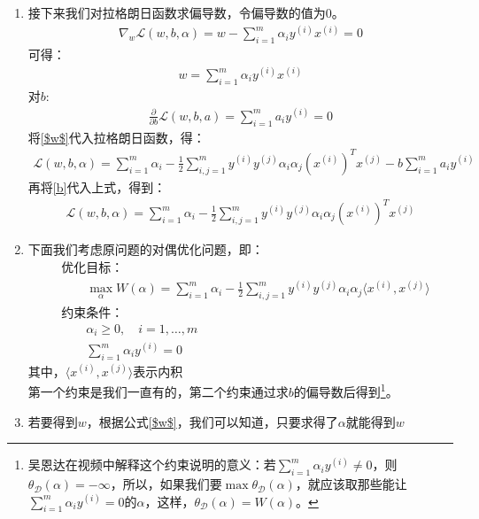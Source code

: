 \begin{enumerate}
	\item 接下来我们对拉格朗日函数求偏导数，令偏导数的值为0。
	\begin{align}
		\nabla_{w}\mathcal{L}(w,b,\alpha)=w - \sum_{i=1}^{m}\alpha_iy^{(i)}x^{(i)}=0
	\end{align}
	可得：
	\begin{align}
		w = \sum_{i=1}^{m}\alpha_iy^{(i)}x^{(i)}
		\label{$w$}
	\end{align}
	对$b$:
	\begin{align}
		\frac{\partial}{\partial b}\mathcal{L}(w,b,a) = \sum_{i=1}^{m}a_iy^{(i)}=0
		\label{b}
	\end{align}
	将\ref{$w$}代入拉格朗日函数，得：
	\begin{align}
		\mathcal{L}(w,b,\alpha) = \sum_{i=1}^{m}\alpha_i-\frac{1}{2}\sum_{i,j=1}^{m}y^{(i)}y^{(j)}\alpha_i\alpha_j (x^{(i)})^Tx^{(j)} - b\sum_{i=1}^{m}a_iy^{(i)}
	\end{align}
	再将\ref{b}代入上式，得到：
	\begin{align}
		\mathcal{L}(w,b,\alpha) = \sum_{i=1}^{m}\alpha_i-\frac{1}{2}\sum_{i,j=1}^{m}y^{(i)}y^{(j)}\alpha_i\alpha_j (x^{(i)})^Tx^{(j)}
	\end{align}
	\item 下面我们考虑原问题的对偶优化问题，即：
	\begin{align}
		&\text{优化目标：} \\
		& \qquad \max_{\alpha} W(\alpha) = \sum_{i=1}^{m}\alpha_i-\frac{1}{2}\sum_{i,j=1}^{m}y^{(i)}y^{(j)}\alpha_i\alpha_j \langle x^{(i)}, x^{(j)}\rangle \\
		&\text{约束条件：} \\
		& \qquad \alpha_i \geq 0, \quad i=1,\dots,m \\
		& \qquad \sum_{i=1}^{m}\alpha_iy^{(i)} = 0
	\end{align}
	其中，$\langle x^{(i)}, x^{(j)}\rangle $表示内积\\
	第一个约束是我们一直有的，第二个约束通过求$b$的偏导数后得到\footnote{吴恩达在视频中解释这个约束说明的意义：若$\sum_{i=1}^{m}\alpha_iy^{(i)} \neq 0$，则$\theta_{\mathcal{D}}(\alpha)=-\infty$，所以，如果我们要$\max \theta_{\mathcal{D}}(\alpha)$，就应该取那些能让$\sum_{i=1}^{m}\alpha_iy^{(i)} = 0$的$\alpha$，这样，$\theta_{\mathcal{D}}(\alpha)=W(\alpha)$。{\color{red}{我也没怎么懂，待后面研究研究}}}。

	\item 若要得到$w$，根据公式\ref{$w$}，我们可以知道，只要求得了$\alpha$就能得到$w$


\end{enumerate}
